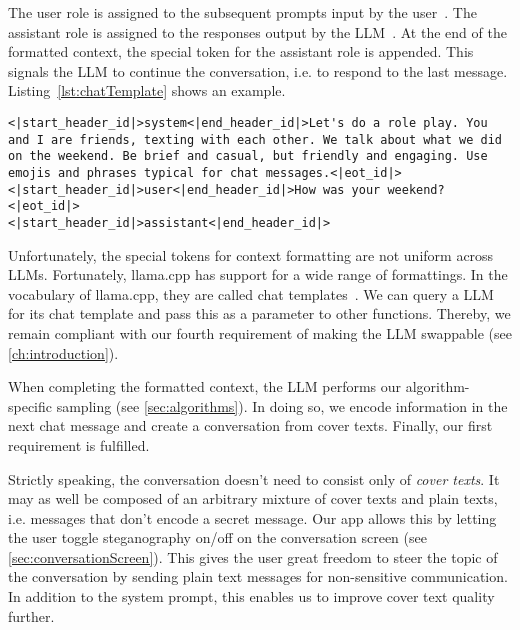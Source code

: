 The user role is assigned to the subsequent prompts input by the user~\cite{jiangChatBugCommonVulnerability2025}. The assistant role is assigned to the responses output by the \gls{LLM}~\cite{jiangChatBugCommonVulnerability2025}. At the end of the formatted context, the special token for the assistant role is appended. This signals the \gls{LLM} to continue the conversation, i.e. to respond to the last message. Listing~\ref{lst:chatTemplate} shows an example.

\vspace{0.25cm}

\begin{lstlisting}[caption={[llama.cpp: Chat templates]{Example for a context formatted with the chat template of Llama 3.2 1B. Some line breaks have been added for readability.}}, label={lst:chatTemplate}]
<|start_header_id|>system<|end_header_id|>Let's do a role play. You and I are friends, texting with each other. We talk about what we did on the weekend. Be brief and casual, but friendly and engaging. Use emojis and phrases typical for chat messages.<|eot_id|>
<|start_header_id|>user<|end_header_id|>How was your weekend?<|eot_id|>
<|start_header_id|>assistant<|end_header_id|>
\end{lstlisting}

Unfortunately, the special tokens for context formatting are not uniform across \glspl{LLM}. Fortunately, llama.cpp has support for a wide range of formattings. In the vocabulary of llama.cpp, they are called chat templates~\cite{gerganovGgerganovLlamacpp2024,jiangChatBugCommonVulnerability2025}. We can query a \gls{LLM} for its chat template and pass this as a parameter to other functions. Thereby, we remain compliant with our fourth requirement of making the \gls{LLM} swappable (see \cref{ch:introduction}).

When completing the formatted context, the \gls{LLM} performs our algorithm-specific sampling (see \cref{sec:algorithms}). In doing so, we encode information in the next chat message and create a conversation from cover texts. Finally, our first requirement is fulfilled.

Strictly speaking, the conversation doesn't need to consist only of \textit{cover texts}. It may as well be composed of an arbitrary mixture of cover texts and plain texts, i.e. messages that don't encode a secret message. Our app allows this by letting the user toggle steganography on/off on the conversation screen (see \cref{sec:conversationScreen}). This gives the user great freedom to steer the topic of the conversation by sending plain text messages for non-sensitive communication. In addition to the system prompt, this enables us to improve cover text quality further.

